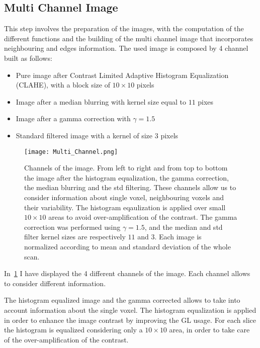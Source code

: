 \documentclass{standalone}
\begin{document}
	\subsection*{Multi Channel Image}
	
		This step involves the preparation of the images, with the computation of the different functions and the building of the multi channel image that incorporates neighbouring and edges information. The used image is composed by 4 channel built as follows:  
		\begin{itemize}
			\item Pure image after Contrast Limited Adaptive Histogram Equalization (CLAHE), with a block size of  $10\times 10$ pixels
			\item Image after a median blurring with kernel size equal to $11$ pixes
			\item Image after a gamma correction with $\gamma = 1.5$
			\item Standard filtered image with a kernel of size $3$ pixels
		\end{itemize}
	
		\begin{figure}[h]
			\centering
				\texttt{[image: Multi\_Channel.png]}
			\caption{Channels of the image. From left to right and from top to bottom the image after the histogram equalization, the gamma correction, the median blurring and the std filtering. These channels allow us to consider information about single voxel, neighbouring voxels and their variability. The histogram eqaulization is applied over small $10\times 10$ areas to avoid  over-amplification of the contrast. The gamma correction was performed using $\gamma = 1.5$, and the median and std filter kernel sizes are respectively $11$ and $3$. Each image is normalized according to mean and standard deviation of the whole scan. }\label{fig:MultiChannel}
		\end{figure}
	
		In \figurename\,\ref{fig:MultiChannel} I have displayed the 4 different channels of the image. Each channel allows to consider different information.
		
		The histogram equalized image and the gamma corrected allows to take into account information about the single voxel. The histogram equalization is applied in order to enhance the image contrast by improving the GL usage. For each slice the histogram is equalized considering only a $10\times 10$ area, in order to take care of the over-amplification of the contrast.
		
\end{document}
